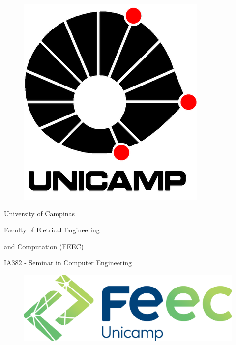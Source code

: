 \begin{titlepage}
\begin{center}

\begin{minipage}{0.2\linewidth}
    \begin{flushleft}
        \begin{figure}[H]
    		\includegraphics[scale=0.21]{Imagens/LOGO-UNICAMP.png}
    	\end{figure}
    \end{flushleft}
\end{minipage}
\begin{minipage}{0.5\linewidth}
	\begin{center}
		
		University of Campinas
		
		Faculty of Eletrical Engineering \

		and Computation (FEEC)
		
            IA382 - Seminar in Computer Engineering

		
	\end{center}
\end{minipage}
\begin{minipage}{0.25\linewidth}
    \begin{flushleft}
        \begin{figure}[H]
    		\includegraphics[scale=0.15]{Imagens/LOGO-FEEC.png}
    	\end{figure}
    \end{flushleft}
\end{minipage}


\end{center}
\end{titlepage}
